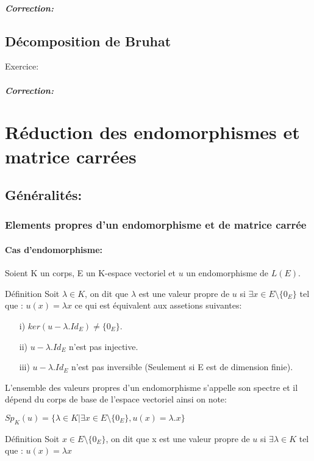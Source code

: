 \documentclass{book}
\begin{document}
\paragraph{Correction:}
\section{Décomposition de Bruhat}
\begin{Ex}[]{Exercice:}{}
\end{Ex}
\paragraph{Correction:}
\chapter{Réduction des endomorphismes et matrice carrées}
\section{Généralités:}
\subsection{Elements propres d'un endomorphisme et de matrice carrée}
\subsubsection{Cas d'endomorphisme:}
Soient K un corps, E un K-espace vectoriel et \(u\) un endomorphisme de \(L(E)\).
\begin{Définition}[]{Définition}{}
Soit \(\lambda\in K\), on dit que \(\lambda\) est une valeur propre de \(u\) si \(\exists x \in E \setminus \{0_{E}\}\) tel que : \(u(x)=\lambda x\) ce qui est équivalent aux assetions suivantes:
\begin{itemize}
    \item[i)] \(ker(u-\lambda.Id_{E}) \neq \{0_{E}\}\).
    \item[ii)] \(u-\lambda.Id_{E}\) n'est pas injective.
    \item[iii)] \(u-\lambda.Id_{E}\) n'est pas inversible (Seulement si E est de dimension finie).
\end{itemize}
L'ensemble des valeurs propres d'un endomorphisme s'appelle son spectre et il dépend du corps de base de l'espace vectoriel ainsi on note:
\begin{center}
\begin{framed}
\(Sp_{K}(u)=\{\lambda \in K|\exists x \in E \setminus \{0_{E}\} , u(x)=\lambda.x\}\) 
\end{framed}
\end{center}
\end{Définition}
\begin{Définition}[]{Définition}{}
Soit \(x \in E \setminus \{0_{E}\}\), on dit que x est une valeur propre de \(u\) si \(\exists \lambda \in K\) tel que : \(u(x)=\lambda x\)
\end{Définition}
\end{document}

